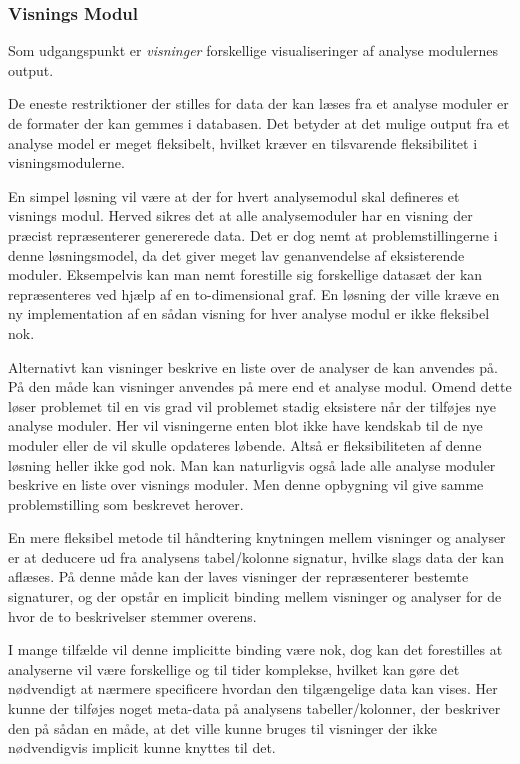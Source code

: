 \subsubsection{Visnings Modul}\label{sec:visningsmodul}

Som udgangspunkt er \textit{visninger} forskellige visualiseringer af analyse modulernes output.

De eneste restriktioner der stilles for data der kan læses fra et analyse moduler er de formater der kan gemmes i databasen.
Det betyder at det mulige output fra et analyse model er meget fleksibelt, hvilket kræver en tilsvarende fleksibilitet i visningsmodulerne.

En simpel løsning vil være at der for hvert analysemodul skal defineres et visnings modul.
Herved sikres det at alle analysemoduler har en visning der præcist repræsenterer genererede data.
Det er dog nemt at problemstillingerne i denne løsningsmodel, da det giver meget lav genanvendelse af eksisterende moduler.
Eksempelvis kan man nemt forestille sig forskellige datasæt der kan repræsenteres ved hjælp af en to-dimensional graf.
En løsning der ville kræve en ny implementation af en sådan visning for hver analyse modul er ikke fleksibel nok.

Alternativt kan visninger beskrive en liste over de analyser de kan anvendes på.
På den måde kan visninger anvendes på mere end et analyse modul.
Omend dette løser problemet til en vis grad vil problemet stadig eksistere når der tilføjes nye analyse moduler.
Her vil visningerne enten blot ikke have kendskab til de nye moduler eller de vil skulle opdateres løbende.
Altså er fleksibiliteten af denne løsning heller ikke god nok.
Man kan naturligvis også lade alle analyse moduler beskrive en liste over visnings moduler.
Men denne opbygning vil give samme problemstilling som beskrevet herover.

En mere fleksibel metode til håndtering knytningen mellem visninger og analyser er at deducere ud fra analysens tabel/kolonne signatur, hvilke slags data der kan aflæses.
På denne måde kan der laves visninger der repræsenterer bestemte signaturer, og der opstår en implicit binding mellem visninger og analyser for de hvor de to beskrivelser stemmer overens.

I mange tilfælde vil denne implicitte binding være nok, dog kan det forestilles at analyserne vil være forskellige og til tider komplekse, hvilket kan gøre det nødvendigt at nærmere specificere hvordan den tilgængelige data kan vises.
Her kunne der tilføjes noget meta-data på analysens tabeller/kolonner, der beskriver den på sådan en måde, at det ville kunne bruges til visninger der ikke nødvendigvis implicit kunne knyttes til det.

